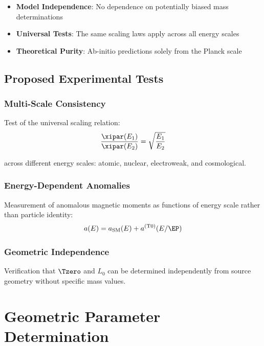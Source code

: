 	\begin{itemize}
		\item \textbf{Model Independence}: No dependence on potentially biased mass determinations
		\item \textbf{Universal Tests}: The same scaling laws apply across all energy scales
		\item \textbf{Theoretical Purity}: Ab-initio predictions solely from the Planck scale
	\end{itemize}
	
	\subsection{Proposed Experimental Tests}
	\label{subsec:experimental_tests}
	
	\subsubsection{Multi-Scale Consistency}
	
	Test of the universal scaling relation:
	\begin{equation}
		\frac{\xipar(E_1)}{\xipar(E_2)} = \sqrt{\frac{E_1}{E_2}}
		\label{eq:scaling_test}
	\end{equation}
	
	across different energy scales: atomic, nuclear, electroweak, and cosmological.
	
	\subsubsection{Energy-Dependent Anomalies}
	
	Measurement of anomalous magnetic moments as functions of energy scale rather than particle identity:
	\begin{equation}
		a(E) = a_{\text{SM}}(E) + a^{(\text{T0})}(E/\EP)
		\label{eq:energy_dependent_anomaly}
	\end{equation}
	
	\subsubsection{Geometric Independence}
	
	Verification that $\Tzero$ and $L_0$ can be determined independently from source geometry without specific mass values.
	
	\section{Geometric Parameter Determination}
	\label{sec:geometric_parameters}
	
